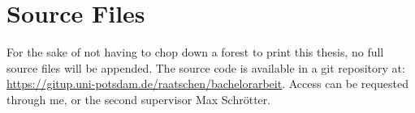 \chapter{Source Files}
For the sake of not having to chop down a forest to print this thesis, no full source files will be appended.
The source code is available in a git repository at: \href{https://gitup.uni-potsdam.de/raatschen/bachelorarbeit}{https://gitup.uni-potsdam.de/raatschen/bachelorarbeit}.
Access can be requested through me, or the second supervisor Max Schrötter.


%
%
\def\UrlBreaks{\do\/\do-}
\begingroup
\sloppy


\endgroup


